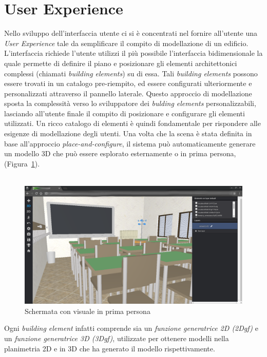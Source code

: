\section{User Experience}
\label{sec:chapter_2_section_1}

Nello sviluppo dell'interfaccia utente ci si è concentrati nel fornire all'utente una \emph{User Experience} tale
da semplificare il compito di modellazione di un edificio.
L'interfaccia richiede l'utente utilizzi il più possibile l'interfaccia bidimensionale la quale permette
di definire il piano e posizionare gli elementi architettonici complessi (chiamati \emph{building elements}) su di essa.
Tali \emph{building elements} possono essere trovati in un catalogo pre-riempito, ed essere
configurati ulteriormente e personalizzati attraverso il pannello laterale. Questo approccio
di modellazione sposta la complessità verso lo sviluppatore dei \emph{bulding elements} personalizzabili,
lasciando all'utente finale il compito di posizionare e configurare gli elementi utilizzati.
Un ricco catalogo di elementi \`e quindi fondamentale per rispondere alle esigenze di modellazione degli utenti.
Una volta che la scena \`e stata definita in base all'approccio \emph{place-and-configure}, il sistema pu\`o automaticamente
generare un modello 3D che pu\`o essere esplorato esternamente o in prima persona,
(Figura~\ref{fig:3D-school}).\\\\

\begin{figure}[htbp] %
   \centering
   \includegraphics[width=1\linewidth]{images/3d-school}
   \caption{Schermata con visuale in prima persona}
   \label{fig:3D-school}
\end{figure}

Ogni \emph{building element} infatti comprende sia un \emph{funzione generatrice 2D (2Dgf)} e un
\emph{funzione generatrice 3D (3Dgf)}, utilizzate per ottenere modelli nella planimetria 2D e in 3D che ha generato il modello
rispettivamente.
